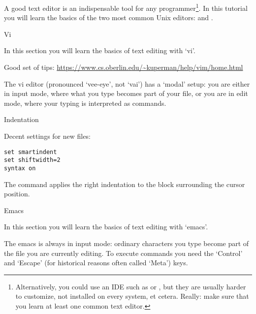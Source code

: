 
A good text editor is an indispensable tool for any
programmer\footnote {Alternatively, you could use an \acf{IDE} such as
 or , but they are
usually harder to customize, not installed on every system, et
cetera. Really: make sure that you learn at least one common text
editor.}. In this tutorial you will learn the basics of the two most
common Unix editors:  and .

 {Vi}

\begin{purpose}
  In this section you will learn the basics of text editing with `vi'.
\end{purpose}

Good set of
tips: \url{https://www.cs.oberlin.edu/~kuperman/help/vim/home.html}

The vi editor (pronounced `vee-eye', not `vai') has a `modal' setup:
you are either in input mode, where what you type becomes part of your
file, or you are in edit mode, where your typing is interpreted as
commands.

 {Indentation}

Decent settings for new files:
\begin{verbatim}
set smartindent
set shiftwidth=2
syntax on
\end{verbatim}

The command \n{[[=]]} applies the right indentation to the block
surrounding the cursor position.


 {Emacs}

\begin{purpose}
  In this section you will learn the basics of text editing with `emacs'.
\end{purpose}

The emacs is always in input mode: ordinary characters you type become
part of the file you are currently editing. To execute commands you
need the `Control' and `Escape' (for historical reasons often called
`Meta') keys.

